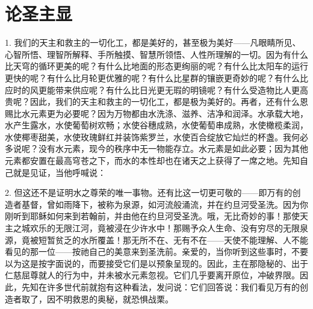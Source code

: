 
\chapter{论圣主显}


1. 我们的天主和救主的一切化工，都是美好的，甚至极为美好——凡眼睛所见、心智所悟、理智所解释、手所触摸、智慧所领悟、人性所理解的一切。因为有什么比天穹的循环更美的呢？有什么比地面的形态更绚丽的呢？有什么比太阳车的运行更快的呢？有什么比月轮更优雅的呢？有什么比星群的镶嵌更奇妙的呢？有什么比应时的风更能带来供应呢？有什么比日光更无瑕的明镜呢？有什么受造物比人更高贵呢？因此，我们的天主和救主的一切化工，都是极为美好的。再者，还有什么恩赐比水元素更为必要呢？因为万物都由水洗涤、滋养、洁净和润泽。水承载大地，水产生露水，水使葡萄树欢畅；水使谷穗成熟，水使葡萄串成熟，水使橄榄柔润，水使椰枣甜美，水使玫瑰鲜红并装饰紫罗兰，水使百合绽放它灿烂的杯盏。我何必多说呢？没有水元素，现今的秩序中无一物能存立。水元素是如此必要；因为其他元素都安置在最高穹苍之下，而水的本性却也在诸天之上获得了一席之地。先知自己就是见证，当他呼喊说：\par

2. 但这还不是证明水之尊荣的唯一事物。还有比这一切更可敬的——即万有的创造者基督，曾如雨降下，被称为泉源，如河流般涌流，并在约旦河受圣洗。因为你刚听到耶稣如何来到若翰前，并由他在约旦河受圣洗。哦，无比奇妙的事！那使天主之城欢乐的无限江河，竟被浸在少许水中！那赐予众人生命、没有穷尽的无限泉源，竟被短暂贫乏的水所覆盖！那无所不在、无有不在——天使不能理解、人不能看见的那一位——按祂自己的美意来到圣洗前。亲爱的，当你听到这些事时，不要以为这是按字面说的，而要接受它们是以预象呈现的。因此，主在那隐秘的、出于仁慈屈尊就人的行为中，并未被水元素忽视。它们几乎要离开原位，冲破界限。因此，先知在许多世代前就抱有这种看法，发问说：它们回答说：我们看见万有的创造者取了，因不明救恩的奥秘，就恐惧战栗。\par

